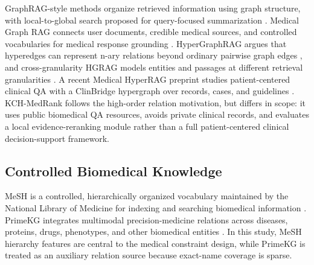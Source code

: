 GraphRAG-style methods organize retrieved information using graph structure, with local-to-global search proposed for query-focused summarization \citep{edge2024graphrag}. Medical Graph RAG connects user documents, credible medical sources, and controlled vocabularies for medical response grounding \citep{wu2024medgraphrag}. HyperGraphRAG argues that hyperedges can represent n-ary relations beyond ordinary pairwise graph edges \citep{luo2025hypergraphrag}, and cross-granularity HGRAG models entities and passages at different retrieval granularities \citep{wang2026hgrag}. A recent Medical HyperRAG preprint studies patient-centered clinical QA with a ClinBridge hypergraph over records, cases, and guidelines \citep{xu2026medicalhyperrag}. KCH-MedRank follows the high-order relation motivation, but differs in scope: it uses public biomedical QA resources, avoids private clinical records, and evaluates a local evidence-reranking module rather than a full patient-centered clinical decision-support framework.

\subsection{Controlled Biomedical Knowledge}

MeSH is a controlled, hierarchically organized vocabulary maintained by the National Library of Medicine for indexing and searching biomedical information \citep{nlm2026mesh}. PrimeKG integrates multimodal precision-medicine relations across diseases, proteins, drugs, phenotypes, and other biomedical entities \citep{chandak2023primekg}. In this study, MeSH hierarchy features are central to the medical constraint design, while PrimeKG is treated as an auxiliary relation source because exact-name coverage is sparse.
